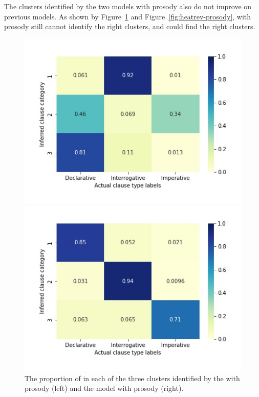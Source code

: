The clusters identified by the two models with prosody also do not improve on previous models. As shown by Figure~\ref{fig:heatmap-prosody} and Figure~\ref{fig:heatrev-prosody}, \dlearnerabbr{} with prosody still cannot identify the right clusters, and \plearnerabbr{} could find the right clusters. 
\begin{figure}[H]
\begin{minipage}[b]{0.45\linewidth}	
    \centering
    \includegraphics[width=1.2\textwidth]{figures/baseline-heatmap-bu.jpg}
\end{minipage}
\begin{minipage}[b]{0.45\linewidth}	
\centering
    \includegraphics[width=1.2\textwidth]{figures/target-heatmap-bu.jpg}
\end{minipage}
    \caption{The proportion of \diis{} in each of the three clusters identified by the \dlearnerabbr{} with prosody (left) and the \plearnerabbr{} model with prosody (right). }
    \label{fig:heatmap-prosody}
\end{figure}

